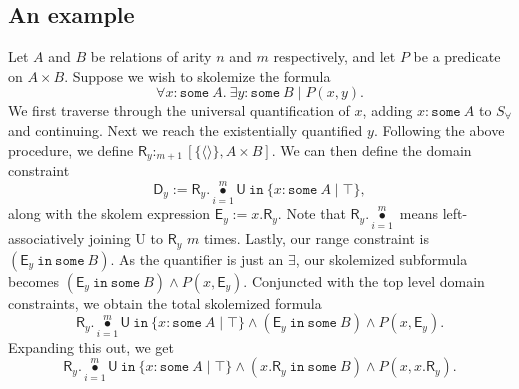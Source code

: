\documentclass{article}
\theoremstyle{definition}
\DeclareMathOperator{\bigdot}{\bullet}
\begin{document}
    \subsection{An example}
    Let $A$ and $B$ be relations of arity $n$ and $m$ respectively, and let $P$ be a predicate on $A\times B$. Suppose we wish to skolemize the formula
    \[\forall x : \texttt{some}\: A. \: \exists y : \texttt{some}\: B \mid P(x,y).\]
    We first traverse through the universal quantification of $x$, adding $x : \texttt{some}\: A$ to $S_\forall$ and continuing. Next we reach the existentially quantified $y$. Following the above procedure, we define $\textsf{R}_y :_{m + 1} [\{\langle \rangle\}, A\times B]$. We can then define the domain constraint
    \[\textsf{D}_y := \textsf{R}_y .\bigdot\limits_{i = 1}^m \textsf{U}~\texttt{in}~\{x : \texttt{some}\: A \mid \top\},\]
    along with the skolem expression $\textsf{E}_y := x.\textsf{R}_y$. Note that $\textsf{R}_y .\bigdot\limits_{i = 1}^m$ means left-associatively joining \textsf{U} to $\textsf{R}_y$ $m$ times. Lastly, our range constraint is $(\textsf{E}_y~\texttt{in}~\texttt{some}~B)$. As the quantifier is just an $\exists$, our skolemized subformula becomes $(\textsf{E}_y ~ \texttt{in}~\texttt{some}~B) \land P(x, \textsf{E}_y)$. Conjuncted with the top level domain constraints, we obtain the total skolemized formula
    \[\textsf{R}_y .\bigdot\limits_{i = 1}^m \textsf{U}~\texttt{in}~\{x : \texttt{some}\: A \mid \top\} \land (\textsf{E}_y ~ \texttt{in}~\texttt{some}~B) \land P(x, \textsf{E}_y).\]
    Expanding this out, we get
    \[\textsf{R}_y .\bigdot\limits_{i = 1}^m \textsf{U}~\texttt{in}~\{x : \texttt{some}\: A \mid \top\} \land (x.\textsf{R}_y ~ \texttt{in}~\texttt{some}~B) \land P(x, x.\textsf{R}_y).\]

  
\end{document}
